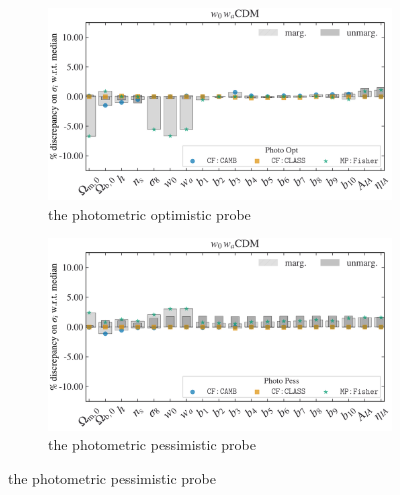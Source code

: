 \documentclass[oneside]{book}
\begin{document}
\begin{figure}
    \begin{subfigure}[b]{0.49\textwidth}
        \centering
        \includegraphics[width=\textwidth]{Photo_Opt_wCDM_error_comparison.pdf}
        \caption{the photometric optimistic probe}
        \label{fig:w0wa_3}
    \end{subfigure}
    \hfill
    \begin{subfigure}[b]{0.49\textwidth}
        \centering
        \includegraphics[width=\textwidth]{Photo_Pess_wCDM_error_comparison.pdf}
        \caption{the photometric pessimistic probe}
        \label{fig:w0wa_4}  
    \end{subfigure}    
       \label{fig:Comparison_w0wa} 
\end{figure}
\end{document}
